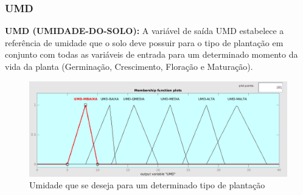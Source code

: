 \subsubsection{UMD}

\textbf{UMD (UMIDADE-DO-SOLO):} A variável de saída UMD estabelece a referência de umidade que o solo deve possuir para o tipo de plantação em conjunto com todas as variáveis de entrada para um determinado momento da vida da planta (Germinação, Crescimento, Floração e Maturação).

\begin{figure}[h!]
\centering
\includegraphics[width=1\linewidth]{Descricao/Imagens/UMD}
\caption{Umidade que se deseja para um determinado tipo de plantação}
\label{fig:UMD}
\end{figure}
